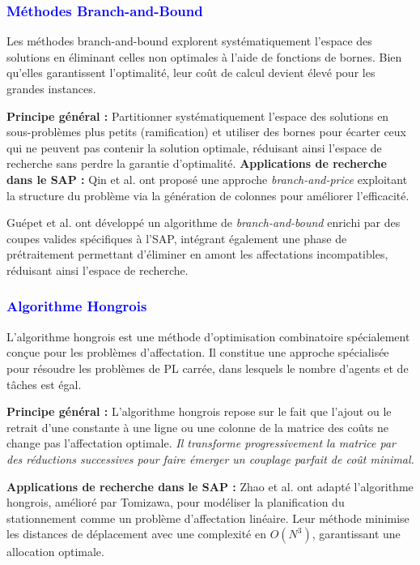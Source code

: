 \subsubsection*{\small{\textcolor{blue}{Méthodes Branch-and-Bound}}}


Les méthodes branch-and-bound explorent systématiquement l’espace des solutions en éliminant celles non optimales à l’aide de fonctions de bornes. Bien qu’elles garantissent l’optimalité, leur coût de calcul devient élevé pour les grandes instances.

\textbf{Principe général :}  
Partitionner systématiquement l’espace des solutions en sous-problèmes plus petits (ramification) et utiliser des bornes pour écarter ceux qui ne peuvent pas contenir la solution optimale, réduisant ainsi l’espace de recherche sans perdre la garantie d’optimalité.
\textbf{Applications de recherche dans le SAP :}  
Qin et al. \cite{Qin_2012} ont proposé une approche \textit{branch-and-price} exploitant la structure du problème via la génération de colonnes pour améliorer l’efficacité.


Guépet et al. \cite{Guepet_2016} ont développé un algorithme de \textit{branch-and-bound} enrichi par des coupes valides spécifiques à l’\ac{SAP}, intégrant également une phase de prétraitement permettant d’éliminer en amont les affectations incompatibles, réduisant ainsi l’espace de recherche.
\vspace{-0.5em}
\subsubsection*{\small{\textcolor{blue}{Algorithme Hongrois}}}
\label{sec:Hungarian}

\vspace{-0.5em}
L’algorithme hongrois est une méthode d’optimisation combinatoire spécialement conçue pour les problèmes d’affectation. Il constitue une approche spécialisée pour résoudre les problèmes de \ac{PL} carrée, dans lesquels le nombre d’agents et de tâches est égal.

\textbf{Principe général :}  
L’algorithme hongrois repose sur le fait que l’ajout ou le retrait d’une constante à une ligne ou une colonne de la matrice des coûts ne change pas l’affectation optimale.  
\textit{Il transforme progressivement la matrice par des réductions successives pour faire émerger un couplage parfait de coût minimal.}

\textbf{Applications de recherche dans le SAP :}  
Zhao et al. \cite{zhao2014algorithm} ont adapté l’algorithme hongrois, amélioré par Tomizawa, pour modéliser la planification du stationnement comme un problème d’affectation linéaire. Leur méthode minimise les distances de déplacement avec une complexité en \(O(N^3)\), garantissant une allocation optimale.

